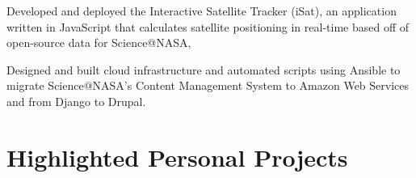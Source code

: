 \documentclass{bluefin_cv}
\begin{document}

\begin{bfcvsuccesslist}
  \item Developed and deployed the Interactive Satellite Tracker (iSat), an application written in JavaScript that calculates satellite positioning in real-time based off of open-source data for Science@NASA,
  \item Designed and built cloud infrastructure and automated scripts using Ansible to migrate Science@NASA’s Content Management System to Amazon Web Services and from Django to Drupal.
\end{bfcvsuccesslist}

\section{Highlighted Personal Projects}

\end{document}
